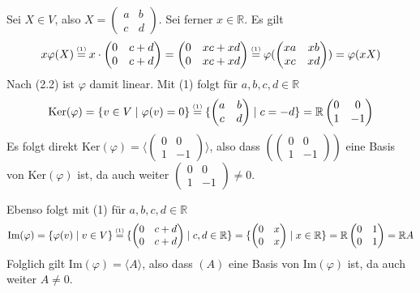 \documentclass[a4paper,graphics,11pt]{article}
\newcommand{\up}[2]{\mathrel{\overset{\makebox[0pt]{\mbox{\normalfont\tiny #2}}}{#1}}}
\begin{document}
Sei $X \in V$, also
$X = \begin{pmatrix}
        a & b\\
	    c & d
    \end{pmatrix}
$. Sei ferner $x \in \mathbb{R}$. Es gilt
$$
    x\varphi(X)
    \up{=}{(1)}
    x\cdot \begin{pmatrix}
		0 & c+d\\
		0 & c+d
	\end{pmatrix}
    =
    \begin{pmatrix}
        0 & xc+xd\\
        0 & xc+xd
	\end{pmatrix}
    \up{=}{(1)}
    \varphi(
    \begin{pmatrix}
        xa & xb\\
        xc & xd
	\end{pmatrix}
    )
    =
    \varphi(xX)
$$
Nach (2.2) ist $\varphi$ damit linear.
\newpage
Mit (1) folgt für $a,b,c,d \in \mathbb{R}$
$$
    \text{Ker}(\varphi)
    = \{v \in V \mid \varphi(v) = 0\}
    \up{=}{(1)} \{\begin{pmatrix}
        a & b\\
        c & d
	\end{pmatrix}
    \mid c = -d\}
    = \mathbb{R}
    \begin{pmatrix}
        0 & 0\\
        1 & -1
	\end{pmatrix}
$$
Es folgt direkt $\text{Ker}(\varphi) = \langle
\begin{pmatrix}
    0 & 0\\
    1 & -1
\end{pmatrix}
\rangle$, also dass $(
\begin{pmatrix}
    0 & 0\\
    1 & -1
\end{pmatrix}
)$ eine Basis von $\text{Ker}(\varphi)$ ist, da auch
weiter $
\begin{pmatrix}
    0 & 0\\
    1 & -1
\end{pmatrix}
\neq 0
$.

Ebenso folgt mit (1) für $a,b,c,d \in \mathbb{R}$
$$
    \text{Im}(\varphi)
    = \{\varphi(v) \mid v \in V\}
    \up{=}{(1)} \{
    \begin{pmatrix}
        0 & c+d\\
        0 & c+d
    \end{pmatrix}
    \mid c,d \in \mathbb{R}\}
    =\{
    \begin{pmatrix}
        0 & x\\
        0 & x
    \end{pmatrix}
    \mid x \in \mathbb{R}\}
    = \mathbb{R}
    \begin{pmatrix}
        0 & 1\\
        0 & 1
    \end{pmatrix}
    = \mathbb{R}A
$$
Folglich gilt $\text{Im}(\varphi) = \langle A\rangle$, also dass $(A)$ eine Basis von $\text{Im}(\varphi)$ ist,
da auch weiter $A \neq 0$.
\end{document}
